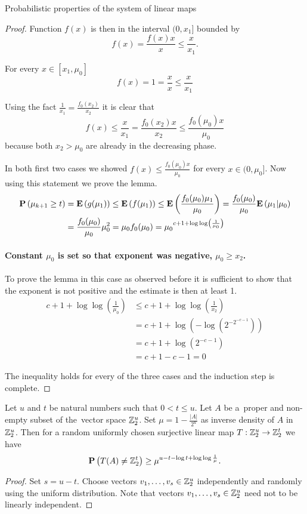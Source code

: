 \begin{section}{Probabilistic properties of the system of linear maps}
\begin{proof}
Function $f(x)$ is then in the interval $(0, x_1]$ bounded by \[f(x) = \frac{f(x)x}{x} \leq \frac{x}{x_1} \text{.} \]

For every $x \in [x_1, \mu_0]$ 
\[ 
	f(x) = 1 = \frac{x}{x} \leq \frac{x}{x_1}
\]

Using the fact $\frac{1}{x_1} = \frac{f_0(x_2)}{x_2}$ it is clear that 
\[
	f(x) \leq \frac{x}{x_1} = \frac{f_0(x_2)x}{x_2} \leq \frac{f_0(\mu_0)x}{\mu_0}
\]
because both $x_2 > \mu_0$ are already in the decreasing phase.

In both first two cases we showed $f(x) \leq \frac{f_0(\mu_0)x}{\mu_0}$ for every $x \in (0, \mu_0]$. Now using this statement we prove the lemma.
\[
\begin{split}
\mathbf{P}\left(\mu_{k + 1} \geq t\right)
	& = \mathbf{E}\left(g(\mu_1)\right) \leq \mathbf{E}\left(f(\mu_1)\right) \leq \mathbf{E}\left(\frac{f_0(\mu_0)\mu_1}{\mu_0}\right) = \frac{f_0(\mu_0)}{\mu_0}\mathbf{E}\left(\mu_1|\mu_0\right) \\
	& = \frac{f_0(\mu_0)}{\mu_0}\mu_0 ^ 2 = \mu_0 f_0(\mu_0) = {\mu_0}^{c + 1 + \log \log \left(\frac{1}{\mu_0}\right)}
\end{split}
\]

\paragraph{Constant $\mu_0$ is set so that exponent was negative, $\mu_0 \geq x_2$.}
To prove the lemma in this case as observed before it is sufficient to show that the exponent is not positive and the estimate is then at least 1.
\[
\begin{split}
	c + 1 + \log \log \left( \frac{1}{\mu_0} \right) 
		& \leq c + 1 + \log \log \left( \frac{1}{x_2} \right) \\ 
		& = c + 1 + \log \left(- \log \left(2 ^ {-2 ^ {-c - 1}}\right)\right) \\ 
		& = c + 1 + \log \left(2 ^ {-c - 1}\right) \\ 
		& = c + 1 - c - 1 = 0
\end{split}
\]

The inequality holds for every of the three cases and the induction step is complete.
\end{proof}

\begin{theorem}
\label{theorem-linear-function-set-onto}
Let $u$ and $t$ be natural numbers such that $0 < t \leq u$. Let $A$ be a~proper and non-empty subset of the~vector space $\mathbb{Z}_{2}^{u}$. Set $\mu = 1 - \frac{|A|}{2^u}$ as inverse density of $A$ in $\mathbb{Z}_{2}^{u}$. Then for a random uniformly chosen surjective linear map $T: \mathbb{Z}_{2}^{u} \rightarrow \mathbb{Z}_{2}^{t}$ we have
\[
	\mathbf{P}\left(T(A) \neq \mathbb{Z}_{2}^{t}\right) \geq \mu^{u - t - \log t + \log \log \frac{1}{\mu}} \textit{.}
\]
\end{theorem}
\begin{proof}
Set $s = u - t$. Choose vectors $v_1, \dots, v_s \in \mathbb{Z}_{2}^{u}$ independently and randomly using the uniform distribution. Note that vectors $v_1, \dots, v_s \in \mathbb{Z}_{2}^{u}$ need not to be linearly independent.


\end{proof}
\end{section}
